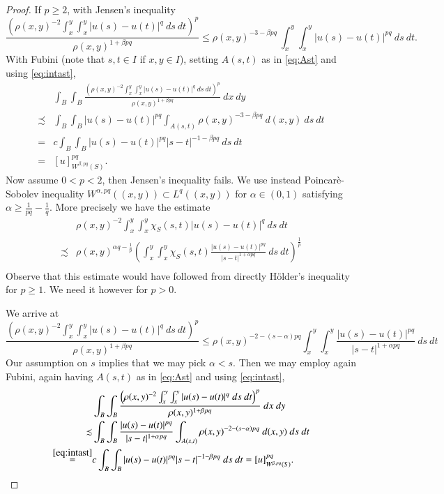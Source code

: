 \documentclass[a4paper,10pt,intlimits,ngerman]{amsart}
\newcommand{\iv}{B} %
\numberwithin{equation}{section}
\newcommand{\aleq}{\precsim}
\newcommand{\brac}[1]{\left ( #1 \right )}
\begin{document}
\begin{appendix}
\begin{proof}
If $p \geq 2$, with Jensen's inequality
\[
 \frac{\brac{\rho(x,y)^{-2} \int_x^y\int_x^y |u(s)-u(t)|^{q}\ ds\ dt}^{p}}{\rho(x,y)^{1+\beta p q}} \leq \rho(x,y)^{-3-\beta p q}\ \int_x^y\int_x^y |u(s)-u(t)|^{pq}\ ds\ dt.
\]
With Fubini (note that $s,t \in I$ if $x,y \in I$), setting $A(s,t)$ as in \eqref{eq:Ast} and using \eqref{eq:intast},
\[
\begin{split}
 &\int_{\iv} \int_{\iv} \frac{\brac{\rho(x,y)^{-2} \int_x^y\int_x^y |u(s)-u(t)|^{q}\ ds\ dt}^{p}}{\rho(x,y)^{1+\beta p q}}\ dx\ dy\\
 \aleq &\int_{\iv} \int_{\iv} |u(s)-u(t)|^{pq} \int_{A(s,t)} \rho(x,y)^{-3-\beta p q}\ d(x,y)\ ds\ dt\\
 =&c\int_{\iv} \int_{\iv} |u(s)-u(t)|^{pq} |s-t|^{-1-\beta p q}\ ds\ dt\\
 =&[u]_{W^{\beta,pq}(S)}^{pq}.
\end{split}
 \]
Now assume $0 < p <2$, then Jensen's inequality fails. We use instead Poincar\`e-Sobolev inequality $W^{\alpha,pq} ((x,y)) \subset L^q((x,y))$ for $\alpha \in (0,1)$ satisfying $\alpha \geq \frac{1}{pq}-\frac{1}{q}$. More precisely we have the estimate
\[
\begin{split}
 &\rho(x,y)^{-2} \int_x^y\int_x^y \chi_S(s,t) |u(s)-u(t)|^{q}\ ds\ dt\\
 \aleq & \rho(x,y)^{\alpha q-\frac{1}{p}} \brac{\int_x^y\int_x^y \chi_S(s,t) \frac{|u(s)-u(t)|^{pq}}{|s-t|^{1+\alpha pq}}\ ds\ dt}^{\frac{1}{p}}\\
\end{split}
 \]
Observe that this estimate would have followed from directly H\"older's inequality for $p \geq 1$. We need it however for $p > 0$.

We arrive at
\[
 \frac{\brac{\rho(x,y)^{-2} \int_x^y\int_x^y |u(s)-u(t)|^{q}\ ds\ dt}^{p}}{\rho(x,y)^{1+\beta p q}} \leq \rho(x,y)^{-2-(s-\alpha)pq}\int_x^y\int_x^y \frac{|u(s)-u(t)|^{pq}}{|s-t|^{1+\alpha pq}}\ ds\ dt
\]
Our assumption on $s$ implies that we may pick $\alpha < s$. Then we may employ again Fubini, again having $A(s,t)$ as in \eqref{eq:Ast} and using \eqref{eq:intast},
\[
\begin{split}
 &\int_{\iv} \int_{\iv} \frac{\brac{\rho(x,y)^{-2} \int_x^y\int_x^y |u(s)-u(t)|^{q}\ ds\ dt}^{p}}{\rho(x,y)^{1+\beta p q}}\ dx\ dy\\
 \aleq &\int_{\iv} \int_{\iv} \frac{|u(s)-u(t)|^{pq}}{|s-t|^{1+\alpha pq}} \int_{A(s,t)} \rho(x,y)^{-2-(s-\alpha)pq}\ d(x,y)\ ds\ dt\\
 \overset{\eqref{eq:intast}}{=}&c\int_{\iv} \int_{\iv} |u(s)-u(t)|^{pq} |s-t|^{-1-\beta p q}\ ds\ dt =[u]_{W^{\beta,pq}(S)}^{pq}.
\end{split}
 \]


\end{proof}
\end{appendix}
\end{document}
